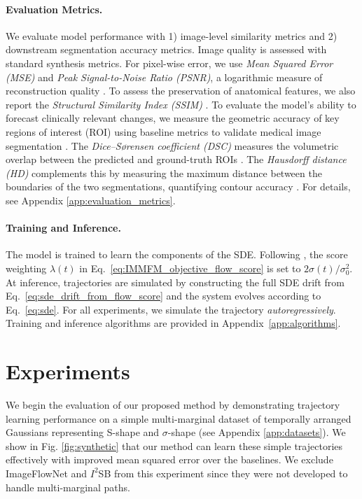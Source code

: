 \documentclass[twoside]{article}
\begin{document}
\paragraph{Evaluation Metrics.} We evaluate model performance with 1) image-level similarity metrics and 2) downstream segmentation accuracy metrics. Image quality is assessed with standard synthesis metrics. For pixel-wise error, we use \emph{Mean Squared Error (MSE)} and \emph{Peak Signal-to-Noise Ratio (PSNR)}, a logarithmic measure of reconstruction quality \citep{hore2010image}. To assess the preservation of anatomical features, we also report the \emph{Structural Similarity Index (SSIM)} \citep{wang2004image}. To evaluate the model's ability to forecast clinically relevant changes, we measure the geometric accuracy of key regions of interest (ROI) using baseline metrics to validate medical image segmentation \citep{taha2015metrics,isensee2021nnu,menze2015multimodal,simpson2019msd,maierhein2022metrics,zou2004statistical,crum2006generalized}. The \emph{Dice--S{\o}rensen coefficient (DSC)} measures the volumetric overlap between the predicted and ground-truth ROIs \citep{dice1945measures,sorensen1948method}. The \emph{Hausdorff distance (HD)} complements this by measuring the maximum distance between the boundaries of the two segmentations, quantifying contour accuracy \citep{huttenlocher1993comparing}. For details, see Appendix \ref{app:evaluation_metrics}.

\paragraph{Training and Inference.}
The model is trained to learn the components of the SDE. Following \citep{tong2023simulation}, the score weighting $\lambda(t)$ in Eq.~\ref{eq:IMMFM_objective_flow_score} is set to $2\sigma(t)/\sigma_0^2$. At inference, trajectories are simulated by constructing the full SDE drift from Eq.~\eqref{eq:sde_drift_from_flow_score} and the system evolves according to Eq.~\eqref{eq:sde}.
For all experiments, we simulate the trajectory \emph{autoregressively}. Training and inference algorithms are provided in Appendix~\ref{app:algorithms}.


\section{Experiments}

We begin the evaluation of our proposed method by demonstrating trajectory learning performance on a simple multi-marginal dataset of temporally arranged Gaussians representing S-shape and $\sigma$-shape (see Appendix \ref{app:datasets}). We show in Fig. \ref{fig:synthetic} that our method can learn these simple trajectories effectively with improved mean squared error over the baselines. We exclude ImageFlowNet \citep{liu2025imageflownet} and $I^2$SB \citep{liu20232} from this experiment since they were not developed to handle multi-marginal paths.
\end{document}
